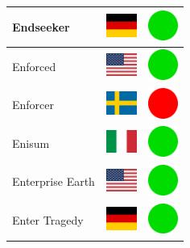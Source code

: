 \documentclass[12pt, a4paper, twoside]{report}
\begin{document}
\begin{center}
\begin{longtable}{|p{5cm}|p{2cm}|p{2cm}|}
 Endseeker                                                  & \includegraphics[width=1cm]{../img/flags/de} &   \includegraphics[width=1cm]{../likes/y} \\ \hline
 Enforced                                                   & \includegraphics[width=1cm]{../img/flags/us} &   \includegraphics[width=1cm]{../likes/y} \\ \hline
 Enforcer                                                   & \includegraphics[width=1cm]{../img/flags/se} &   \includegraphics[width=1cm]{../likes/n} \\ \hline
 Enisum                                                     & \includegraphics[width=1cm]{../img/flags/it} &   \includegraphics[width=1cm]{../likes/y} \\ \hline
 Enterprise Earth                                           & \includegraphics[width=1cm]{../img/flags/us} &   \includegraphics[width=1cm]{../likes/y} \\ \hline
 Enter Tragedy                                              & \includegraphics[width=1cm]{../img/flags/de} &   \includegraphics[width=1cm]{../likes/y} \\ \hline

\end{longtable}
\end{center}
\end{document}
